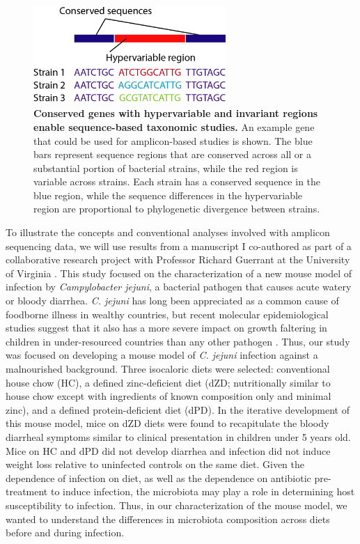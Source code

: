 \documentclass[11pt,twocolumn,notitlepage,openany,twoside]{book}
\begin{document}
\begin{refsection}
\begin{figure}[tb]
\centering
\includegraphics[width=0.65\textwidth]{ch1_fig1}
\caption[Conserved genes with hypervariable and invariant regions enable sequence-based taxonomic studies.]{\textbf{Conserved genes with hypervariable and invariant regions enable sequence-based taxonomic studies.} An example gene that could be used for amplicon-based studies is shown. The blue bars represent sequence regions that are conserved across all or a substantial portion of bacterial strains, while the red region is variable across strains. Each strain has a conserved sequence in the blue region, while the sequence differences in the hypervariable region are proportional to phylogenetic divergence between strains.}
\end{figure}

To illustrate the concepts and conventional analyses involved with amplicon sequencing data, we will use results from a manuscript I co-authored as part of a collaborative research project with Professor Richard Guerrant at the University of Virginia \cite{Giallourou2018-ew}. This study focused on the characterization of a new mouse model of infection by \textit{Campylobacter jejuni}, a bacterial pathogen that causes acute watery or bloody diarrhea. \textit{C. jejuni} has long been appreciated as a common cause of foodborne illness in wealthy countries, but recent molecular epidemiological studies suggest that it also has a more severe impact on growth faltering in children in under-resourced countries than any other pathogen \cite{Amour2016-wc, Platts-Mills2015-vi}. Thus, our study was focused on developing a mouse model of \textit{C. jejuni} infection against a malnourished background. Three isocaloric diets were selected: conventional house chow (HC), a defined zinc-deficient diet (dZD; nutritionally similar to house chow except with ingredients of known composition only and minimal zinc), and a defined protein-deficient diet (dPD). In the iterative development of this mouse model, mice on dZD diets were found to recapitulate the bloody diarrheal symptoms similar to clinical presentation in children under 5 years old. Mice on HC and dPD did not develop diarrhea and infection did not induce weight loss relative to uninfected controls on the same diet. Given the dependence of infection on diet, as well as the dependence on antibiotic pre-treatment to induce infection, the microbiota may play a role in determining host susceptibility to infection. Thus, in our characterization of the mouse model, we wanted to understand the differences in microbiota composition across diets before and during infection.


\end{refsection}
\end{document}

